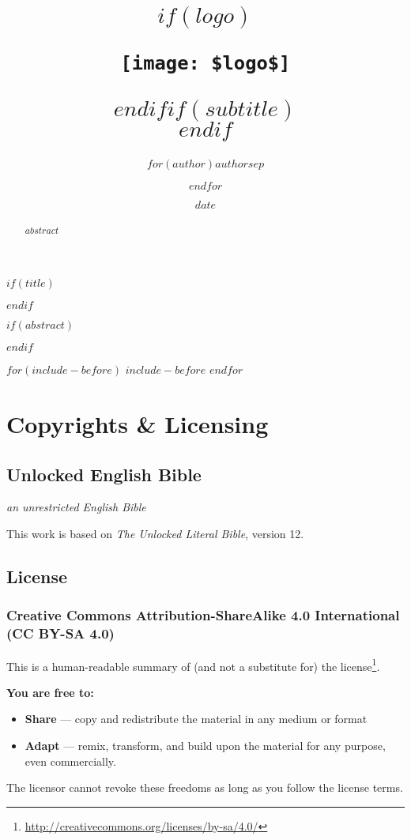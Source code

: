 \documentclass[$fontsize$pt,$if(lang)$$lang$,$endif$$if(papersize)$$papersize$,$endif$$for(classoption)$$classoption$$sep$,$endfor$,openany]{$documentclass$}
\title{$if(logo)$\begin{center}\texttt{[image: \$logo\$]}\end{center}\vspace{\baselineskip}$endif$\Huge $if(subtitle)$\\\vspace{0.5em}{\LARGE }$endif$}
\author{$for(author)$$author$$sep$ \and $endfor$}
\date{\small $date$}
\renewcommand{\href}[2]{#2\footnote{\url{#1}}}
\begin{document}

$if(title)$
  \maketitle
$endif$

$if(abstract)$
  \begin{abstract}
    $abstract$
  \end{abstract}
$endif$

\newpage
{}

$for(include-before)$
  $include-before$
$endfor$

\section{Copyrights \& Licensing}\label{copyrights-licensing}

\subsection{Unlocked English Bible}

\textit{an unrestricted English Bible}

This work is based on \textit{The Unlocked Literal Bible}, version 12.

\subsection{License}
\subsubsection{Creative Commons Attribution-ShareAlike 4.0 International (CC BY-SA 4.0)}

This is a human-readable summary of (and not a substitute for) the \href{http://creativecommons.org/licenses/by-sa/4.0/}{license}.

\textbf{You are free to:}

\begin{itemize}
\item \textbf{Share} — copy and redistribute the material in any medium or format
\item \textbf{Adapt} — remix, transform, and build upon the material for any purpose, even commercially.
\end{itemize}

The licensor cannot revoke these freedoms as long as you follow the license terms.
\end{document}
